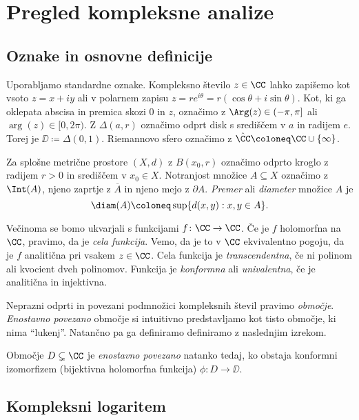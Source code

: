 \section{Pregled kompleksne analize} \label{sec:hipgeom}

\subsection{Oznake in osnovne definicije}

Uporabljamo standardne oznake. Kompleksno število \(z \in \CC\) lahko zapišemo kot vsoto \(z = x + i y\) ali v polarnem zapisu \(z = r e^{i \theta} = r (\cos \theta + i \sin \theta)\). Kot, ki ga oklepata abscisa in premica skozi \(0\) in \(z\), označimo z \(\Arg (z) \in (- \pi, \pi]\) ali \(\arg (z) \in [0, 2 \pi)\). Z \(\Delta (a, r)\) označimo odprt disk s središčem v \(a\) in radijem \(e\). Torej je \(\DD \coloneq \Delta (0, 1)\). Riemannovo sfero označimo z \(\hat{\CC} \coloneq \CC \cup \{\infty\}\).

Za splošne metrične prostore \((X, d)\) z \(B (x_0, r)\) označimo odprto kroglo z radijem \(r > 0\) in središčem v \(x_0 \in X\). Notranjost množice \(A \subseteq X\) označimo z \(\Int (A)\), njeno zaprtje z \(\overline{A}\) in njeno mejo z \(\partial A\). \emph{Premer} ali \emph{diameter} množice \(A\) je
\[\diam (A) \coloneq \sup \{d (x, y) : x, y \in A\}.\]

Večinoma se bomo ukvarjali s funkcijami \(f \colon \CC \to \CC\). Če je \(f\) holomorfna na \(\CC\), pravimo, da je \emph{cela funkcija}. Vemo, da je to v \(\CC\) ekvivalentno pogoju, da je \(f\) analitična pri vsakem \(z \in \CC\). Cela funkcija je \emph{transcendentna}, če ni polinom ali kvocient dveh polinomov. Funkcija je \emph{konformna} ali \emph{univalentna}, če je analitična in injektivna.

Neprazni odprti in povezani podmnožici kompleksnih števil pravimo \emph{območje}. \emph{Enostavno povezano} območje si intuitivno predstavljamo kot tisto območje, ki nima ``lukenj''. Natančno pa ga definiramo definiramo z naslednjim izrekom.

\begin{definicija}
    Območje \(D \subsetneq \CC\) je \emph{enostavno povezano} natanko tedaj, ko obstaja konformni izomorfizem (bijektivna holomorfna funkcija) \(\phi \colon D \to \DD\).
\end{definicija}

\subsection{Kompleksni logaritem}

